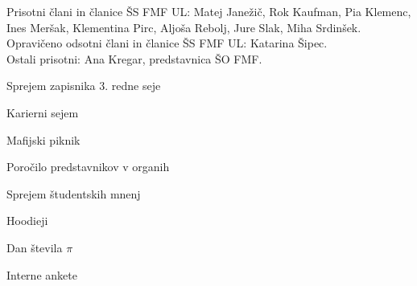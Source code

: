 \documentclass{seja}
\begin{document}
Prisotni člani in članice ŠS FMF UL:
Matej Janežič,
Rok Kaufman,
Pia Klemenc,
Ines Meršak,
Klementina Pirc,
Aljoša Rebolj,
Jure Slak,
Miha Srdinšek.
\\
Opravičeno odsotni člani in članice ŠS FMF UL:
Katarina Šipec.
\\
Ostali prisotni:
Ana Kregar, predstavnica ŠO FMF.

\begin{red*}
  \item Sprejem zapisnika 3. redne seje
  \item Karierni sejem
  \item Mafijski piknik
  \item Poročilo predstavnikov v organih
  \item Sprejem študentskih mnenj
  \item Hoodieji
  \item Dan števila $\pi$
  \item Interne ankete
\end{red*}
\end{document}
